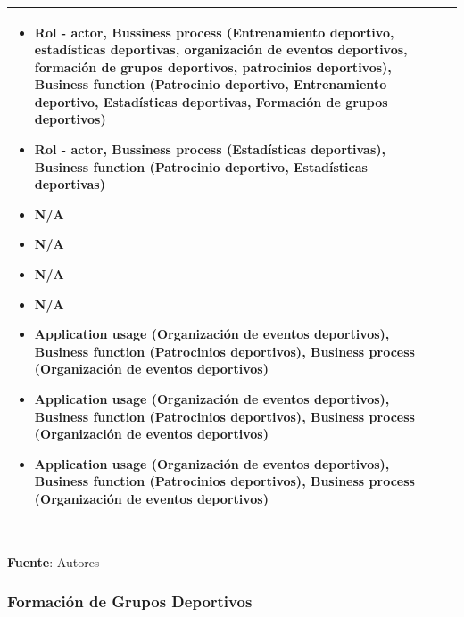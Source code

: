 \begin{table}[!htb]
\begin{center}
{\begin{tabular}{|p{7cm}|p{4cm}|}
\begin{itemize}
				\item Rol - actor, Bussiness process (Entrenamiento deportivo, estadísticas deportivas, organización de eventos deportivos, formación de grupos deportivos, patrocinios deportivos), Business function (Patrocinio deportivo, Entrenamiento deportivo, Estadísticas deportivas, Formación de grupos deportivos)
				\item Rol - actor, Bussiness process (Estadísticas deportivas), Business function (Patrocinio deportivo, Estadísticas deportivas)
				\item N/A
				\item N/A
				\item N/A
				\item N/A
				\item Application usage (Organización de eventos deportivos), Business function (Patrocinios deportivos), Business process (Organización de eventos deportivos)
				\item Application usage (Organización de eventos deportivos), Business function (Patrocinios deportivos), Business process (Organización de eventos deportivos)
				\item Application usage (Organización de eventos deportivos), Business function (Patrocinios deportivos), Business process (Organización de eventos deportivos)
			\end{itemize} 
			\\
			\hline
		\end{tabular}
		} \\
		\textbf{Fuente}: Autores
	\end{center}
\end{table}

\subsubsection{Formación de Grupos Deportivos}

